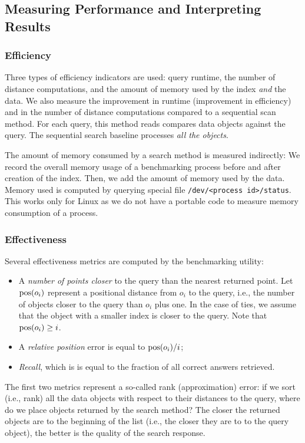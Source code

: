 \documentclass[runningheads,a4paper]{llncs}
\newcommand{\ttt}[1]{\texttt{#1}}
\newcommand{\pos}{\mbox{\rm pos}}
\begin{document}
{\subsection{Measuring Performance and Interpreting Results}\label{SectionMeasurePerf}
\subsubsection{Efficiency}
Three types of efficiency indicators are used: query runtime, the number of distance computations,
and the amount of memory used by the index \emph{and} the data.
We also measure the improvement in runtime (improvement in efficiency) 
and in the number of distance computations compared to a sequential scan method. 
For each query, this method reads compares data objects against the query.
The sequential search baseline processes \emph{all the objects}. 

The amount of memory consumed by a search method is measured indirectly: 
We record the overall memory usage of a benchmarking process before and after creation of the index. Then, we add the amount of memory used by the data.
Memory used is computed by querying special file \ttt{/dev/<process id>/status}. 
This works only for Linux as we do not have a portable code to measure memory consumption of a process.

\subsubsection{Effectiveness}

Several effectiveness metrics are computed by the benchmarking utility:
\begin{itemize}
\item  A \emph{number of points closer} to the query than the nearest returned point.
Let $\pos(o_i)$ represent a positional distance from $o_i$ to the query, 
i.e., the number of objects closer to the query than $o_i$ plus one.
In the case of ties, we assume that the object with a smaller index is closer to the query.
Note that $\pos(o_i) \ge i$.
\item A \emph{relative position} error is equal to $\pos(o_i)/i$;
\item \emph{Recall},  which is is equal to the fraction of all correct answers retrieved.
\end{itemize}
The first two metrics represent a so-called rank (approximation) error:
if we sort (i.e., rank) all the data objects with respect to their distances to the query,
where do we place objects returned by the search method?
The closer the returned objects are to the beginning of the list (i.e., 
the closer they are to to the query object), the better is the quality of the search response.

}
\end{document}
